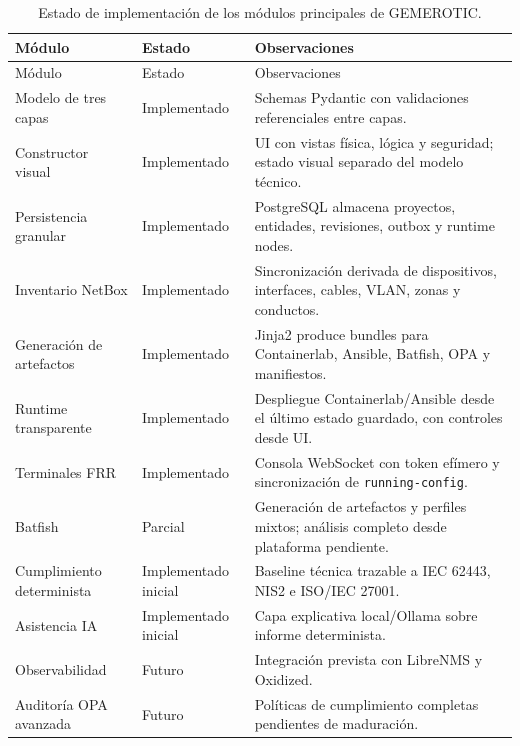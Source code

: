 \begin{longtable}{p{4.0cm}p{3.0cm}p{7.2cm}}
    \caption{Estado de implementación de los módulos principales de GEMEROTIC.}
    \label{tab:estado-implementacion}\\
    \toprule
    Módulo & Estado & Observaciones \\
    \midrule
    \endfirsthead
    \toprule
    Módulo & Estado & Observaciones \\
    \midrule
    \endhead
    Modelo de tres capas & Implementado & Schemas Pydantic con validaciones referenciales entre capas. \\
    Constructor visual & Implementado & UI con vistas física, lógica y seguridad; estado visual separado del modelo técnico. \\
    Persistencia granular & Implementado & PostgreSQL almacena proyectos, entidades, revisiones, outbox y runtime nodes. \\
    Inventario NetBox & Implementado & Sincronización derivada de dispositivos, interfaces, cables, VLAN, zonas y conductos. \\
    Generación de artefactos & Implementado & Jinja2 produce bundles para Containerlab, Ansible, Batfish, OPA y manifiestos. \\
    Runtime transparente & Implementado & Despliegue Containerlab/Ansible desde el último estado guardado, con controles desde UI. \\
    Terminales FRR & Implementado & Consola WebSocket con token efímero y sincronización de \texttt{running-config}. \\
    Batfish & Parcial & Generación de artefactos y perfiles mixtos; análisis completo desde plataforma pendiente. \\
    Cumplimiento determinista & Implementado inicial & Baseline técnica trazable a IEC 62443, NIS2 e ISO/IEC 27001. \\
    Asistencia IA & Implementado inicial & Capa explicativa local/Ollama sobre informe determinista. \\
    Observabilidad & Futuro & Integración prevista con LibreNMS y Oxidized. \\
    Auditoría OPA avanzada & Futuro & Políticas de cumplimiento completas pendientes de maduración. \\
    \bottomrule
\end{longtable}
